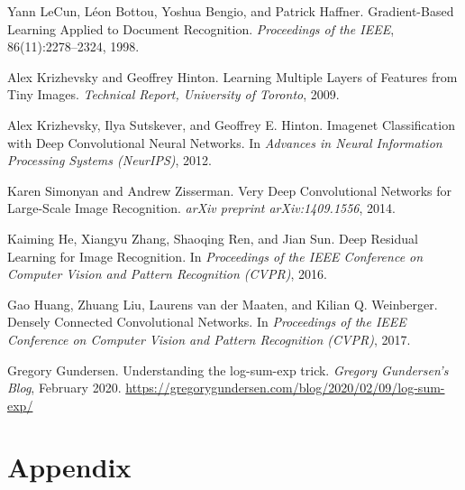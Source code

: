 \documentclass{article}
\begin{document}
\begin{thebibliography}{99}
Yann LeCun, Léon Bottou, Yoshua Bengio, and Patrick Haffner.
\newblock Gradient-Based Learning Applied to Document Recognition.
\newblock \textit{Proceedings of the IEEE}, 86(11):2278--2324, 1998.
\newblock 

Alex Krizhevsky and Geoffrey Hinton.
\newblock Learning Multiple Layers of Features from Tiny Images.
\newblock \textit{Technical Report, University of Toronto}, 2009.
\newblock 

Alex Krizhevsky, Ilya Sutskever, and Geoffrey E. Hinton.
\newblock Imagenet Classification with Deep Convolutional Neural Networks.
\newblock In \textit{Advances in Neural Information Processing Systems (NeurIPS)}, 2012.
\newblock 

Karen Simonyan and Andrew Zisserman.
\newblock Very Deep Convolutional Networks for Large-Scale Image Recognition.
\newblock \textit{arXiv preprint arXiv:1409.1556}, 2014.
\newblock 

Kaiming He, Xiangyu Zhang, Shaoqing Ren, and Jian Sun.
\newblock Deep Residual Learning for Image Recognition.
\newblock In \textit{Proceedings of the IEEE Conference on Computer Vision and Pattern Recognition (CVPR)}, 2016.
\newblock 

Gao Huang, Zhuang Liu, Laurens van der Maaten, and Kilian Q. Weinberger.
\newblock Densely Connected Convolutional Networks.
\newblock In \textit{Proceedings of the IEEE Conference on Computer Vision and Pattern Recognition (CVPR)}, 2017.
\newblock 


Gregory Gundersen.
\newblock Understanding the log-sum-exp trick.
\newblock \emph{Gregory Gundersen’s Blog}, February 2020.
\newblock \url{https://gregorygundersen.com/blog/2020/02/09/log-sum-exp/}


\end{thebibliography}













\section{Appendix}
 
\vspace{-1em}  
\end{document}
